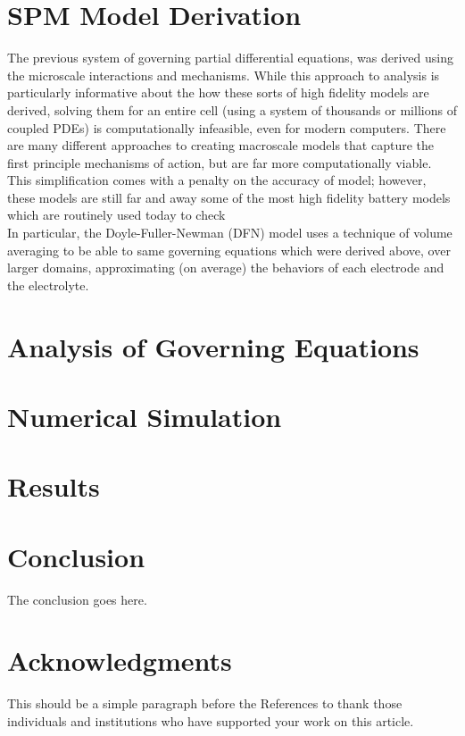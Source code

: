 \documentclass[lettersize,journal]{IEEEtran}
\begin{document}
\section{SPM Model Derivation}

The previous system of governing partial differential equations, was derived using the microscale interactions and mechanisms. While this approach to analysis is particularly informative about the how these sorts of high fidelity models are derived, solving them for an entire cell (using a system of thousands or millions of coupled PDEs) is computationally infeasible, even for modern computers. There are many different approaches to creating macroscale models that capture the first principle mechanisms of action, but are far more computationally viable. This simplification comes with a penalty on the accuracy of model; however, these models are still far and away some of the most high fidelity battery models which are routinely used today to check  \\

In particular, the Doyle-Fuller-Newman (DFN) model uses a technique of volume averaging to be able to same governing equations which were derived above, over larger domains, approximating (on average) the behaviors of each electrode and the electrolyte. \\



\section{Analysis of Governing Equations}

\section{Numerical Simulation}

\section{Results}

\section{Conclusion}
The conclusion goes here.


\section*{Acknowledgments}
This should be a simple paragraph before the References to thank those individuals and institutions who have supported your work on this article.
\end{document}
